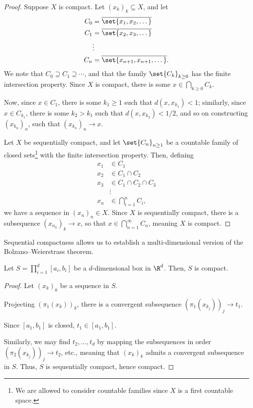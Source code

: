 \documentclass[10pt]{mypackage}
\begin{document}
\begin{proof}
  Suppose $X$ is compact. Let $\left( x_k \right)_{k}\subseteq X$, and let
  \begin{align*}
    C_0 &= \overline{\set{x_1,x_2,\dots}}\\
    C_1 &= \overline{\set{x_2,x_3,\dots}}\\
        &\vdots\\
    C_n &= \overline{\set{x_{n+1},x_{n+1},\dots}}.
  \end{align*}
  We note that $C_0\supseteq C_1\supseteq \cdots$, and that the family $\set{C_k}_{k\geq 0}$ has the finite intersection property. Since $X$ is compact, there is some $x\in \bigcap_{k\geq 0}C_k$.\newline

  Now, since $x\in C_1$, there is some $k_1 \geq 1$ such that $d\left( x,x_{k_1} \right) < 1$; similarly, since $x\in C_{k_1}$, there is some $k_2 > k_1$ such that $d\left( x,x_{k_2} \right) < 1/2$, and so on constructing $\left( x_{k_n} \right)_{n}$, such that $\left( x_{k_n} \right)_n\rightarrow x$.\newline

  Let $X$ be sequentially compact, and let $\set{C_n}_{n\geq 1}$ be a countable family of closed sets\footnote{We are allowed to consider countable families since $X$ is a first countable space.} with the finite intersection property. Then, defining
  \begin{align*}
    x_1 &\in C_1\\
    x_2 &\in C_1\cap C_2\\
    x_3 &\in C_1\cap C_2\cap C_3\\
        &\vdots\\
    x_n &\in \bigcap_{i=1}^{n}C_i,
  \end{align*}
  we have a sequence in $\left( x_n \right)_n\in X$. Since $X$ is sequentially compact, there is a subsequence $\left( x_{n_k} \right)_{k}\rightarrow x$, so that $x \in \bigcap_{n=1}^{\infty}C_n$, meaning $X$ is compact.
\end{proof}
Sequential compactness allows us to establish a multi-dimensional version of the Bolzano--Weierstrass theorem.
\begin{theorem}
  Let $S = \prod_{i=1}^{d}\left[ a_i,b_i \right]$ be a $d$-dimensional box in $\R^d$. Then, $S$ is compact.
\end{theorem}
\begin{proof}
  Let $\left( x_k \right)_k$ be a sequence in $S$.\newline

  Projecting $\left( \pi_1\left( x_k \right) \right)_k$, there is a convergent subsequence $\left( \pi_1\left( x_{k_j} \right) \right)_j\rightarrow t_1$.\newline

  Since $\left[ a_1,b_1 \right]$ is closed, $t_1\in \left[ a_1,b_1 \right]$.\newline

  Similarly, we may find $t_2,\dots,t_d$ by mapping the subsequences in order $\left( \pi_2\left( x_{k_j} \right) \right)_j\rightarrow t_2$, etc., meaning that $\left( x_k \right)_k$ admits a convergent subsequence in $S$. Thus, $S$ is sequentially compact, hence compact.
\end{proof}
\end{document}
